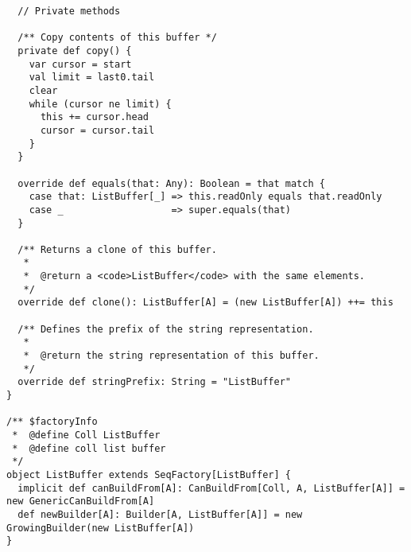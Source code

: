 \begin{lstlisting}
  // Private methods

  /** Copy contents of this buffer */
  private def copy() {
    var cursor = start
    val limit = last0.tail
    clear
    while (cursor ne limit) {
      this += cursor.head
      cursor = cursor.tail
    }
  }

  override def equals(that: Any): Boolean = that match {
    case that: ListBuffer[_] => this.readOnly equals that.readOnly
    case _                   => super.equals(that)
  }

  /** Returns a clone of this buffer.
   *
   *  @return a <code>ListBuffer</code> with the same elements.
   */
  override def clone(): ListBuffer[A] = (new ListBuffer[A]) ++= this

  /** Defines the prefix of the string representation.
   *
   *  @return the string representation of this buffer.
   */
  override def stringPrefix: String = "ListBuffer"
}

/** $factoryInfo
 *  @define Coll ListBuffer
 *  @define coll list buffer
 */
object ListBuffer extends SeqFactory[ListBuffer] {
  implicit def canBuildFrom[A]: CanBuildFrom[Coll, A, ListBuffer[A]] = new GenericCanBuildFrom[A]
  def newBuilder[A]: Builder[A, ListBuffer[A]] = new GrowingBuilder(new ListBuffer[A])
}
\end{lstlisting}
